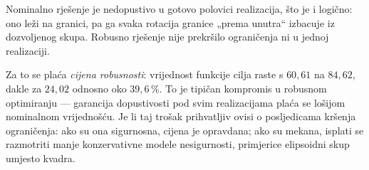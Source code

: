 Nominalno rješenje je nedopustivo u gotovo polovici realizacija, što je i
logično: ono leži na granici, pa ga svaka rotacija granice „prema unutra“
izbacuje iz dozvoljenog skupa. Robusno rješenje nije prekršilo ograničenja ni u
jednoj realizaciji.

Za to se plaća \emph{cijena robusnosti}: vrijednost funkcije cilja raste s
$60{,}61$ na $84{,}62$, dakle za $24{,}02$ odnosno oko $39{,}6\,\%$. To je
tipičan kompromis u robusnom optimiranju --- garancija dopustivosti pod svim
realizacijama plaća se lošijom nominalnom vrijednošću. Je li taj trošak
prihvatljiv ovisi o posljedicama kršenja ograničenja: ako su ona sigurnosna,
cijena je opravdana; ako su mekana, isplati se razmotriti manje konzervativne
modele nesigurnosti, primjerice elipsoidni skup umjesto kvadra.
